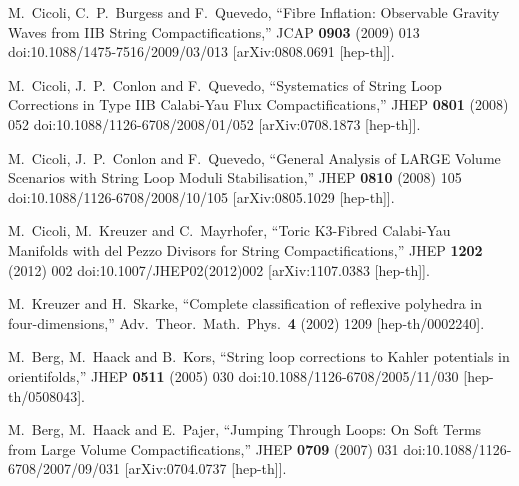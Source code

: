 \documentclass[11pt,a4paper]{article}
\begin{document}
\begin{thebibliography}{99}
  M.~Cicoli, C.~P.~Burgess and F.~Quevedo,
  ``Fibre Inflation: Observable Gravity Waves from IIB String Compactifications,''
  JCAP {\bf 0903} (2009) 013
  doi:10.1088/1475-7516/2009/03/013
  [arXiv:0808.0691 [hep-th]].
	
  M.~Cicoli, J.~P.~Conlon and F.~Quevedo,
  ``Systematics of String Loop Corrections in Type IIB Calabi-Yau Flux Compactifications,''
  JHEP {\bf 0801} (2008) 052
  doi:10.1088/1126-6708/2008/01/052
  [arXiv:0708.1873 [hep-th]].

  M.~Cicoli, J.~P.~Conlon and F.~Quevedo,
  ``General Analysis of LARGE Volume Scenarios with String Loop Moduli Stabilisation,''
  JHEP {\bf 0810} (2008) 105
  doi:10.1088/1126-6708/2008/10/105
  [arXiv:0805.1029 [hep-th]].

  M.~Cicoli, M.~Kreuzer and C.~Mayrhofer,
  ``Toric K3-Fibred Calabi-Yau Manifolds with del Pezzo Divisors for String Compactifications,''
  JHEP {\bf 1202} (2012) 002
  doi:10.1007/JHEP02(2012)002
  [arXiv:1107.0383 [hep-th]].

  M.~Kreuzer and H.~Skarke,
  ``Complete classification of reflexive polyhedra in four-dimensions,''
  Adv.\ Theor.\ Math.\ Phys.\  {\bf 4} (2002) 1209
  [hep-th/0002240].

  M.~Berg, M.~Haack and B.~Kors,
  ``String loop corrections to Kahler potentials in orientifolds,''
  JHEP {\bf 0511} (2005) 030
  doi:10.1088/1126-6708/2005/11/030
  [hep-th/0508043].

  M.~Berg, M.~Haack and E.~Pajer,
  ``Jumping Through Loops: On Soft Terms from Large Volume Compactifications,''
  JHEP {\bf 0709} (2007) 031
  doi:10.1088/1126-6708/2007/09/031
  [arXiv:0704.0737 [hep-th]].


\end{thebibliography}
\end{document}
